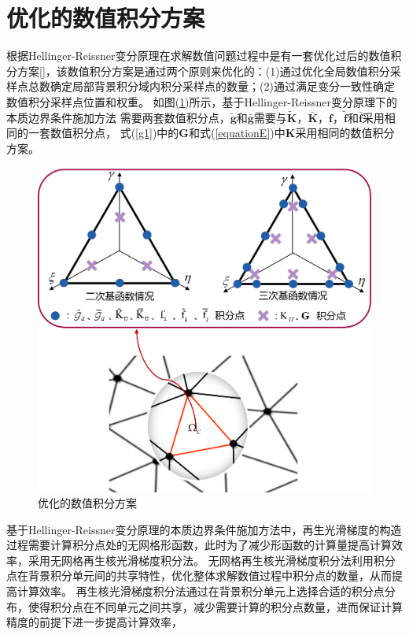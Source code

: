 \section{优化的数值积分方案}
根据Hellinger-Reissner变分原理在求解数值问题过程中是有一套优化过后的数值积分方案[]，该数值积分方案是通过两个原则来优化的：(1)通过优化全局数值积分采样点总数确定局部背景积分域内积分采样点的数量；(2)通过满足变分一致性确定数值积分采样点位置和权重。
如图(\ref{Eintegralscheme})所示，基于Hellinger-Reissner变分原理下的本质边界条件施加方法
需要两套数值积分点，$\tilde{\pmb g}$和$\bar{\pmb g}$需要与$\tilde{\pmb{K}}$，$\bar{\pmb{K}}$，$\pmb{f}$，$\tilde{\pmb{f}}$和$\bar{\pmb{f}}$采用相同的一套数值积分点，
式(\ref{g1})中的$\pmb{G}$和式(\ref{equationE})中$\pmb{K}$采用相同的数值积分方案。\par
\begin{figure}[H]
    \centering
    \includegraphics[scale=0.6]{figure/EHR/Eintegralscheme.png}
    \caption{优化的数值积分方案}\label{Eintegralscheme}
\end{figure}
基于Hellinger-Reissner变分原理的本质边界条件施加方法中，再生光滑梯度的构造过程需要计算积分点处的无网格形函数，此时为了减少形函数的计算量提高计算效率，采用无网格再生核光滑梯度积分法。
无网格再生核光滑梯度积分法\cite{}利用积分点在背景积分单元间的共享特性，优化整体求解数值过程中积分点的数量，从而提高计算效率。
再生核光滑梯度积分法通过在背景积分单元上选择合适的积分点分布，使得积分点在不同单元之间共享，减少需要计算的积分点数量，进而保证计算精度的前提下进一步提高计算效率，
